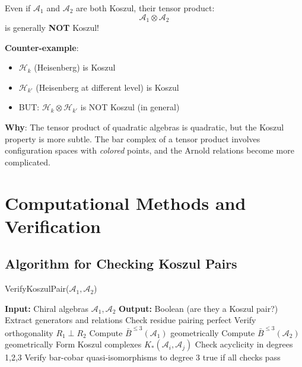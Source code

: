 \begin{remark}
Even if $\mathcal{A}_1$ and $\mathcal{A}_2$ are both Koszul, their tensor product:
\begin{equation}
\mathcal{A}_1 \otimes \mathcal{A}_2
\end{equation}
is generally \textbf{NOT} Koszul!

\textbf{Counter-example}: 
\begin{itemize}
\item $\mathcal{H}_k$ (Heisenberg) is Koszul
\item $\mathcal{H}_{k'}$ (Heisenberg at different level) is Koszul  
\item BUT: $\mathcal{H}_k \otimes \mathcal{H}_{k'}$ is NOT Koszul (in general)
\end{itemize}

\textbf{Why}: The tensor product of quadratic algebras is quadratic, but the Koszul property is more subtle. The bar complex of a tensor product involves configuration spaces with \emph{colored} points, and the Arnold relations become more complicated.
\end{remark}


\section{Computational Methods and Verification}

\subsection{Algorithm for Checking Koszul Pairs}

\begin{algorithm}
\caption{VerifyKoszulPair($\mathcal{A}_1, \mathcal{A}_2$)}
\begin{algorithmic}[1]
\State \textbf{Input:} Chiral algebras $\mathcal{A}_1, \mathcal{A}_2$
\State \textbf{Output:} Boolean (are they a Koszul pair?)
\State
{}
    \State Extract generators and relations
    \State Check residue pairing perfect
    \State Verify orthogonality $R_1 \perp R_2$
\Else
    \State Compute $\bar{B}^{\leq 3}(\mathcal{A}_1)$ geometrically
    \State Compute $\bar{B}^{\leq 3}(\mathcal{A}_2)$ geometrically
    \State Form Koszul complexes $K_*(\mathcal{A}_i, \mathcal{A}_j)$
    \State Check acyclicity in degrees 1,2,3
\EndIf
\State Verify bar-cobar quasi-isomorphisms to degree 3
\State \Return true if all checks pass
\end{algorithmic}
\end{algorithm}

